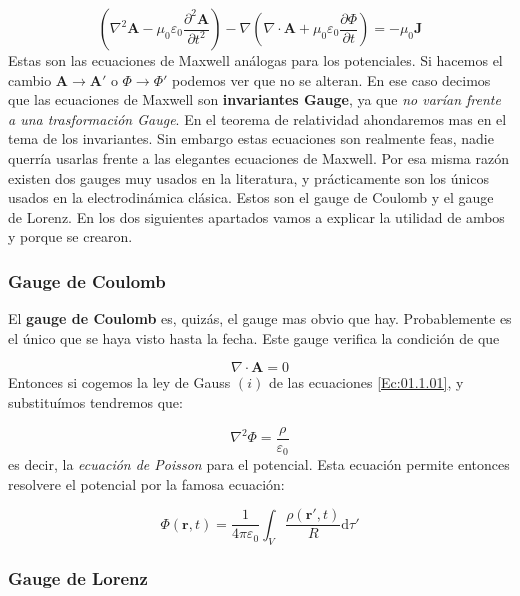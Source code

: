 \documentclass[12pt,a4paper]{article}
\newcommand{\parentesis}[1]{\left( #1  \right)}
\newcommand{\parciales}[2]{\frac{\partial #1}{\partial #2}}
\newcommand{\D}{\mathrm{d}}
\newcommand{\dive}{\nabla \cdot}
\newcommand{\Jn}{\mathbf{J}}
\newcommand{\rn}{\mathbf{r}}
\newcommand{\An}{\mathbf{A}}
\numberwithin{equation}{section}
\numberwithin{figure}{section}
\begin{document}
\begin{equation}
\parentesis{\nabla^2 \An  - \mu_0 \varepsilon_0 \parciales{^2\An}{t^2}} - \nabla \parentesis{\dive \An + \mu_0 \varepsilon_0 \parciales{\Phi}{t}} = - \mu_0 \Jn\label{Ec:01.3.10}
\end{equation}
Estas son las ecuaciones de Maxwell análogas para los potenciales. Si hacemos el cambio $\An \rightarrow \An'$ o $\Phi \rightarrow \Phi'$ podemos ver que no se alteran. En ese caso decimos que las ecuaciones de Maxwell son  \textbf{invariantes Gauge}, ya que \textit{no varían frente a una trasformación Gauge}. En el teorema de relatividad ahondaremos mas en el tema de los invariantes. Sin embargo estas ecuaciones son realmente feas, nadie querría usarlas frente a las elegantes ecuaciones de Maxwell. Por esa misma razón existen dos gauges muy usados en la literatura, y prácticamente son los únicos usados en la electrodinámica clásica. Estos son el gauge de Coulomb y el gauge de Lorenz. En los dos siguientes apartados vamos a explicar la utilidad de ambos y porque se crearon.

\subsubsection{Gauge de Coulomb}

El \textbf{gauge de Coulomb} es, quizás, el gauge mas obvio que hay. Probablemente es el único que se haya visto hasta la fecha. Este gauge verifica la condición de que

\begin{equation} 
\dive \An = 0
\end{equation}
Entonces si cogemos la ley de Gauss $(i)$ de las ecuaciones \ref{Ec:01.1.01}, y substituímos tendremos que:

\begin{equation}
\nabla^2 \Phi = \dfrac{\rho}{\varepsilon_0}
\end{equation}
es decir, la \textit{ecuación de Poisson} para el potencial. Esta ecuación permite entonces resolvere el potencial por la famosa ecuación:

\begin{equation}
\Phi (\rn,t) = \dfrac{1}{4 \pi \varepsilon_0} \int_V \dfrac{\rho(\rn',t)}{R} \D \tau'
\end{equation}

\subsubsection{Gauge de Lorenz}
\end{document}
